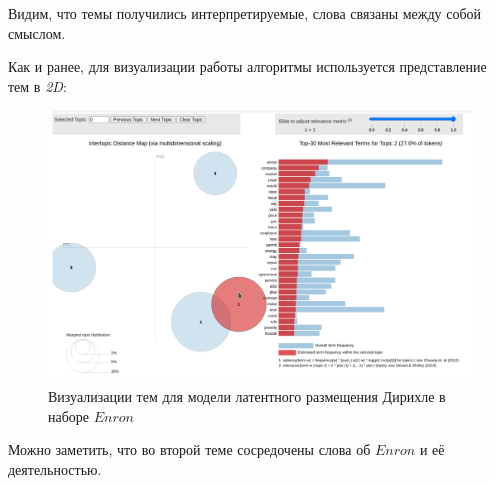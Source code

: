 Видим, что темы получились интерпретируемые, слова связаны между собой смыслом.

Как и ранее, для визуализации работы алгоритмы используется представление тем в
\textit{2D}:

\begin{figure}[H]
\centering
\includegraphics[scale=0.5]{pics/enron-lda-2d.png}
\caption{Визуализации тем для модели латентного размещения Дирихле в наборе $Enron$}
\end{figure}

Можно заметить, что во второй теме сосредочены слова об $Enron$ и её деятельностью.

